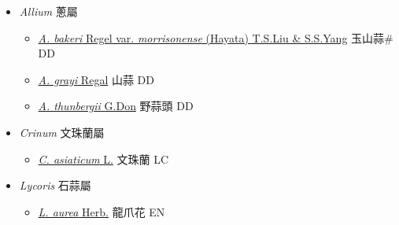 
  \begin{itemize}
 \item[] \textit{Allium} 蔥屬
                    
  \begin{itemize}
        \item[] \href{http://www.theplantlist.org/tpl1.1/search?q=Allium+bakeri+var.+morrisonense}{\textit{A. bakeri} Regel var. \textit{morrisonense} (Hayata) T.S.Liu \& S.S.Yang}   玉山蒜\# DD
        \item[] \href{http://www.theplantlist.org/tpl1.1/search?q=Allium+grayi}{\textit{A. grayi} Regal}   山蒜 DD
        \item[] \href{http://www.theplantlist.org/tpl1.1/search?q=Allium+thunbergii}{\textit{A. thunbergii} G.Don}   野蒜頭 DD
  \end{itemize}
 \item[] \textit{Crinum} 文珠蘭屬
                    
  \begin{itemize}
        \item[] \href{http://www.theplantlist.org/tpl1.1/search?q=Crinum+asiaticum}{\textit{C. asiaticum} L.}   文珠蘭 LC
  \end{itemize}
 \item[] \textit{Lycoris} 石蒜屬
                    
  \begin{itemize}
        \item[] \href{http://www.theplantlist.org/tpl1.1/search?q=Lycoris+aurea}{\textit{L. aurea} Herb.}   龍爪花 EN
  \end{itemize}
  \end{itemize}

